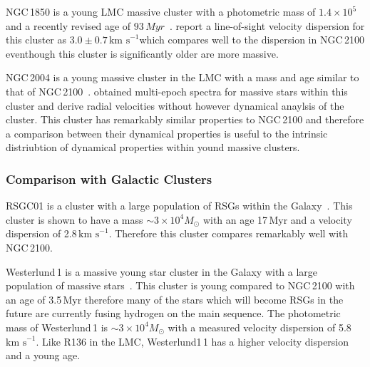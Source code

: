 \documentclass[useAMS,usenatbib]{mn2e}
\def\kms{$\mbox{km s}^{-1}$}
\begin{document}
NGC\,1850 is a young LMC massive cluster with a photometric mass of $1.4\times10^{5}$ and a recently revised age of $93\,Myr$~\citep{2015A&A...575A..62N}.
\citet{2005ApJS..161..304M} report a line-of-sight velocity dispersion for this cluster as $3.0\pm0.7\,$\kms which compares well to the dispersion in NGC\,2100 eventhough this cluster is significantly older are more massive.

NGC\,2004 is a young massive cluster in the LMC with a mass and age similar to that of NGC\,2100~\citep[20\,Myr; $2\times10^{4}M_{\odot}$][and references therein]{2015A&A...575A..62N}.
\citet{2006A&A...456..623E} obtained multi-epoch spectra for massive stars within this cluster and derive radial velocities without however dynamical anaylsis of the cluster.
This cluster has remarkably similar properties to NGC\,2100 and therefore a comparison between their dynamical properties is useful to the intrinsic distriubtion of dynamical properties within yound massive clusters.


\subsubsection{Comparison with Galactic Clusters} %
\label{sub:galactic_clusters}

RSGC01 is a cluster with a large population of RSGs within the Galaxy~\citep{2007ApJ...671..781D}.
This cluster is shown to have a mass $\sim3\times10^{4}M_{\odot}$ with an age 17\,Myr and a velocity dispersion of 2.8\,\kms.
Therefore this cluster compares remarkably well with NGC\,2100.

Westerlund\,1 is a massive young star cluster in the Galaxy with a large population of massive stars~\citep{2005A&A...434..949C}.
This cluster is young compared to NGC\,2100 with an age of 3.5\,Myr therefore many of the stars which will become RSGs in the future are currently fusing hydrogen on the main sequence.
The photometric mass of Westerlund\,1 is $\sim3\times10^{4}M_{\odot}$ with a measured velocity dispersion of 5.8\,\kms.
Like R136 in the LMC, Westerlund1\,1 has a higher velocity dispersion and a young age.



\end{document}
